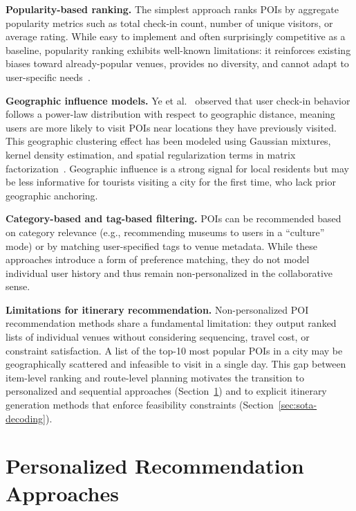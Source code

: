 \textbf{Popularity-based ranking.} The simplest approach ranks POIs by aggregate popularity metrics such as total check-in count, number of unique visitors, or average rating. While easy to implement and often surprisingly competitive as a baseline, popularity ranking exhibits well-known limitations: it reinforces existing biases toward already-popular venues, provides no diversity, and cannot adapt to user-specific needs~\cite{werneck2021poi}.

\textbf{Geographic influence models.} Ye et al.~\cite{ye2011geo} observed that user check-in behavior follows a power-law distribution with respect to geographic distance, meaning users are more likely to visit POIs near locations they have previously visited. This geographic clustering effect has been modeled using Gaussian mixtures, kernel density estimation, and spatial regularization terms in matrix factorization~\cite{cheng2012fused, ye2011geo}. Geographic influence is a strong signal for local residents but may be less informative for tourists visiting a city for the first time, who lack prior geographic anchoring.

\textbf{Category-based and tag-based filtering.} POIs can be recommended based on category relevance (e.g., recommending museums to users in a ``culture'' mode) or by matching user-specified tags to venue metadata. While these approaches introduce a form of preference matching, they do not model individual user history and thus remain non-personalized in the collaborative sense.

\textbf{Limitations for itinerary recommendation.} Non-personalized POI recommendation methods share a fundamental limitation: they output ranked lists of individual venues without considering sequencing, travel cost, or constraint satisfaction. A list of the top-10 most popular POIs in a city may be geographically scattered and infeasible to visit in a single day. This gap between item-level ranking and route-level planning motivates the transition to personalized and sequential approaches (Section~\ref{sec:sota-pers}) and to explicit itinerary generation methods that enforce feasibility constraints (Section~\ref{sec:sota-decoding}).

\section{Personalized Recommendation Approaches}
\label{sec:sota-pers}

